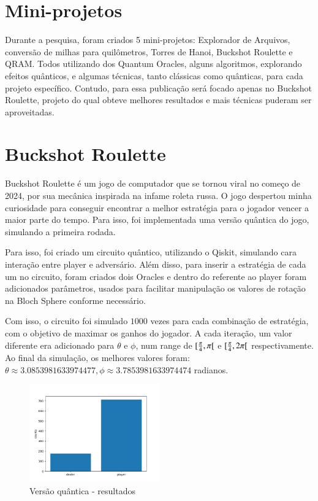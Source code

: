 \documentclass[12pt]{elsarticle}
\begin{document}
\section{Mini-projetos}
\label{sec:impl}

Durante a pesquisa, foram criados 5 mini-projetos: Explorador de Arquivos, conversão de milhas para quilômetros, Torres de Hanoi, Buckshot Roulette e QRAM. Todos utilizando dos Quantum Oracles, alguns algoritmos, explorando efeitos quânticos, e algumas técnicas, tanto clássicas como quânticas, para cada projeto específico. Contudo, para essa publicação será focado apenas no Buckshot Roulette, projeto do qual obteve melhores resultados e mais técnicas puderam ser aproveitadas.

\section{Buckshot Roulette}
\label{sec:bck}
Buckshot Roulette é um jogo de computador que se tornou viral no começo de 2024, por sua mecânica inspirada na infame roleta russa. O jogo despertou minha curiosidade para conseguir encontrar a melhor estratégia para o jogador vencer a maior parte do tempo. Para isso, foi implementada uma versão quântica do jogo, simulando a primeira rodada.

Para isso, foi criado um circuito quântico, utilizando o Qiskit, simulando cara interação entre player e adversário. Além disso, para inserir a estratégia de cada um no circuito, foram criados dois Oracles e dentro do referente ao player foram adicionados parâmetros, usados para facilitar manipulação os valores de rotação na Bloch Sphere conforme necessário.

Com isso, o circuito foi simulado $1000$ vezes para cada combinação de estratégia, com o objetivo de maximar os ganhos do jogador. A cada iteração, um valor diferente era adicionado para $\theta$ e $\phi$, num range de $[{\pi\over{4}}, \pi[$ e $[{\pi\over{4}}, 2\pi[$ respectivamente. Ao final da simulação, os melhores valores foram: $\theta\approx 3.0853981633974477, \phi\approx3.7853981633974474$ radianos.


\begin{figure}[h]
	\centering
	\includegraphics[width=0.5\textwidth]{final_buckshot_roulette_quantum_optimal_strategy}
	\caption{Versão quântica - resultados}
	\label{fig:quantum-version}
\end{figure}
\end{document}

